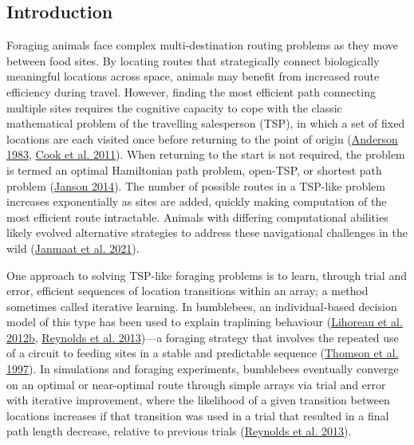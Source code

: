 \documentclass[twoside,12pt,final]{ucthesis-CA2012}
\begin{document}
\begin{ucmainmatter}
\hypertarget{introduction-1}{%
\section{Introduction}\label{introduction-1}}

Foraging animals face complex multi-destination routing problems as they move between food sites. By locating routes that strategically connect biologically meaningful locations across space, animals may benefit from increased route efficiency during travel. However, finding the most efficient path connecting multiple sites requires the cognitive capacity to cope with the classic mathematical problem of the travelling salesperson (TSP), in which a set of fixed locations are each visited once before returning to the point of origin (\protect\hyperlink{ref-anderson1983}{Anderson 1983}, \protect\hyperlink{ref-cook2011}{Cook et al. 2011}). When returning to the start is not required, the problem is termed an optimal Hamiltonian path problem, open-TSP, or shortest path problem (\protect\hyperlink{ref-janson2014}{Janson 2014}). The number of possible routes in a TSP-like problem increases exponentially as sites are added, quickly making computation of the most efficient route intractable. Animals with differing computational abilities likely evolved alternative strategies to address these navigational challenges in the wild (\protect\hyperlink{ref-janmaat2021}{Janmaat et al. 2021}).

One approach to solving TSP-like foraging problems is to learn, through trial and error, efficient sequences of location transitions within an array; a method sometimes called iterative learning. In bumblebees, an individual-based decision model of this type has been used to explain traplining behaviour (\protect\hyperlink{ref-lihoreau2012}{Lihoreau et al. 2012b}, \protect\hyperlink{ref-reynolds2013}{Reynolds et al. 2013})---a foraging strategy that involves the repeated use of a circuit to feeding sites in a stable and predictable sequence (\protect\hyperlink{ref-thomson1997}{Thomson et al. 1997}). In simulations and foraging experiments, bumblebees eventually converge on an optimal or near-optimal route through simple arrays via trial and error with iterative improvement, where the likelihood of a given transition between locations increases if that transition was used in a trial that resulted in a final path length decrease, relative to previous trials (\protect\hyperlink{ref-reynolds2013}{Reynolds et al. 2013}).


\end{ucmainmatter}
\end{document}
